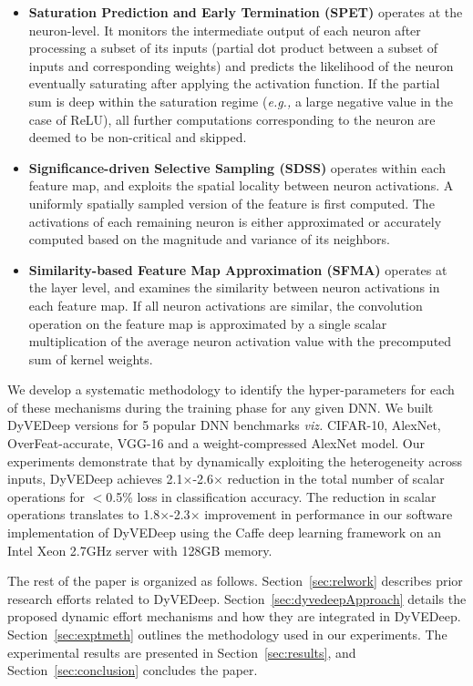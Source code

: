 \documentclass{article} %
\begin{document}
\begin{itemize}
    \item {\bf Saturation Prediction and Early Termination (SPET)} operates at the neuron-level. It monitors the intermediate output of each neuron after processing a subset of its inputs (partial dot product between a subset of inputs and corresponding weights) and predicts the likelihood of the neuron eventually saturating after applying the activation function. If the partial sum is deep within the saturation regime (\emph{e.g.,} a large negative value in the case of ReLU), all further computations corresponding to the neuron are deemed to be non-critical and skipped.
    \item {\bf Significance-driven Selective Sampling (SDSS)} operates within each feature map, and exploits the spatial locality between neuron activations. A uniformly spatially sampled version of the feature is first computed. The activations of each remaining neuron is either approximated or accurately computed based on the magnitude and variance of its neighbors. 
    \item {\bf Similarity-based Feature Map Approximation (SFMA)} operates at the layer level, and examines the similarity between neuron activations in each feature map. If all neuron activations are similar, the convolution operation on the feature map is approximated by a single scalar multiplication of the average neuron activation value with the precomputed sum of kernel weights.
\end{itemize}

We develop a systematic methodology to identify the hyper-parameters for each of these mechanisms during the training phase for any given DNN. We built DyVEDeep versions for 5 popular DNN benchmarks \emph{viz.} CIFAR-10, AlexNet, OverFeat-accurate, VGG-16 and a weight-compressed AlexNet model. Our experiments demonstrate that by dynamically exploiting the heterogeneity across inputs, DyVEDeep achieves 2.1$\times$-2.6$\times$ reduction in the total number of scalar operations for $<$0.5\% loss in classification accuracy. The reduction in scalar operations translates to 1.8$\times$-2.3$\times$ improvement in performance in our software implementation of DyVEDeep using the Caffe deep learning framework on an Intel Xeon 2.7GHz server with 128GB memory.

The rest of the paper is organized as follows. Section~\ref{sec:relwork} describes prior research efforts related to DyVEDeep. Section~\ref{sec:dyvedeepApproach} details the proposed dynamic effort mechanisms and how they are integrated in DyVEDeep. Section~\ref{sec:exptmeth} outlines the methodology used in our experiments. The experimental results are presented in Section~\ref{sec:results}, and Section~\ref{sec:conclusion} concludes the paper. 
\end{document}
